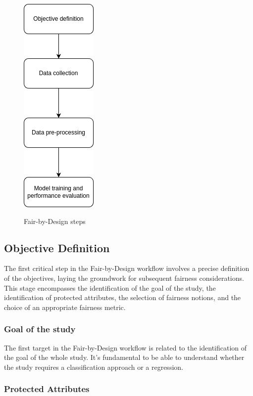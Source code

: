 \begin{figure}[h]
    \centering
    \includegraphics[width=.3\textwidth, height=.8\textwidth]{workflow-steps.png}
    \label{fig:steps}
    \caption{Fair-by-Design steps}
\end{figure}
    


\subsection{Objective Definition}
\label{subsection:objective}

The first critical step in the Fair-by-Design workflow involves a precise definition of the objectives, laying the groundwork for subsequent fairness considerations. This stage encompasses the identification of the goal of the study, the identification of protected attributes, the selection of fairness notions, and the choice of an appropriate fairness metric.

\subsubsection{Goal of the study}

The first target in the Fair-by-Design workflow is related to the identification of the goal of the whole study. It's fundamental to be able to understand whether the study requires a classification approach or a regression.


\subsubsection{Protected Attributes}


